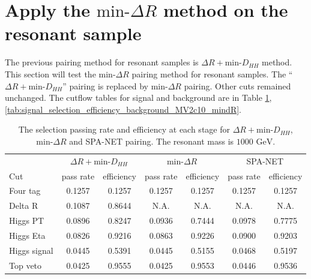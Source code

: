 \documentclass[12pt]{article}
\begin{document}
\section{Apply the \texorpdfstring{$\text{min-}\Delta R$}{min delta R} method on the resonant sample}%
\label{sec:apply_the_min_delta_r_method_on_the_resonant_sample}
	The previous pairing method for resonant samples is $\Delta R+\text{min-}D_{HH}$ method. This section will test the $\text{min-}\Delta R$ pairing method for resonant samples. The ``$\Delta R + \text{min-}D_{HH}$'' pairing is replaced by $\text{min-}\Delta R$ pairing. Other cuts remained unchanged. The cutflow tables for signal and background are in Table \ref{tab:signal_selection_efficiency_1000GeV_MV2c10_mindR}, \ref{tab:signal_selection_efficiency_background_MV2c10_mindR}.
	\begin{table}[htpb]
		\centering
		\caption{The selection passing rate and efficiency at each stage for $\Delta R + \text{min-}D_{HH}$, $\text{min-}\Delta R$ and SPA-NET pairing. The resonant mass is $\text{1000 GeV}$.}
		\label{tab:signal_selection_efficiency_1000GeV_MV2c10_mindR}
		\begin{tabular}{l|cc|cc|cc}
				 & \multicolumn{2}{c|}{$\Delta R + \text{min-}D_{HH}$} & \multicolumn{2}{c|}{$\text{min-}\Delta R$} & \multicolumn{2}{c}{SPA-NET} \\
			Cut	 & pass rate               & efficiency               & pass rate           & efficiency          & pass rate    & efficiency   \\ \hline
			Four tag     & 0.1257 & 0.1257 & 0.1257 & 0.1257 & 0.1257 & 0.1257 \\
			Delta R      & 0.1087 & 0.8644 & N.A.   & N.A.   & N.A.   & N.A.   \\
			Higgs PT     & 0.0896 & 0.8247 & 0.0936 & 0.7444 & 0.0978 & 0.7775 \\
			Higgs Eta    & 0.0826 & 0.9216 & 0.0863 & 0.9226 & 0.0900 & 0.9203 \\
			Higgs signal & 0.0445 & 0.5391 & 0.0445 & 0.5155 & 0.0468 & 0.5197 \\
			Top veto     & 0.0425 & 0.9555 & 0.0425 & 0.9553 & 0.0446 & 0.9536
		\end{tabular}
	\end{table}
\end{document}
